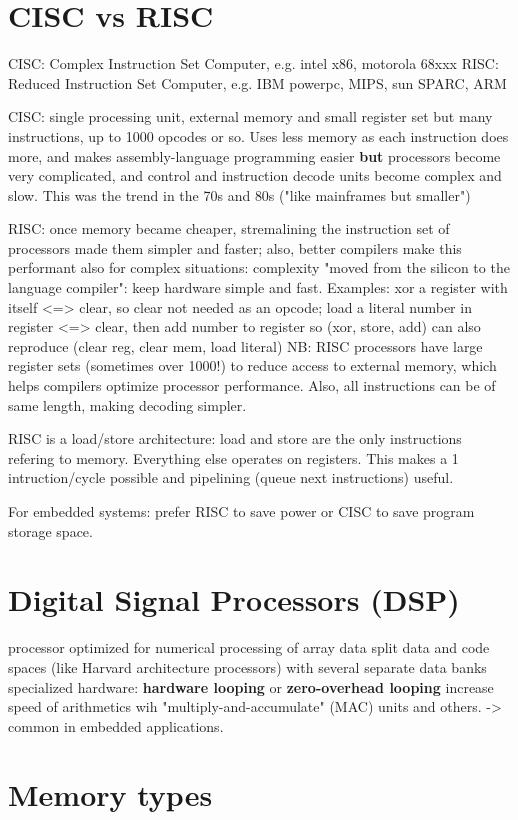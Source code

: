 \documentclass[11pt]{article}
\begin{document}
\section{CISC vs RISC}
\label{sec:org2ea98f2}
CISC: Complex Instruction Set Computer, e.g. intel x86, motorola 68xxx
RISC: Reduced Instruction Set Computer, e.g. IBM powerpc, MIPS, sun SPARC, ARM

CISC: single processing unit, external memory and small register set but many
instructions, up to 1000 opcodes or so. Uses less memory as each instruction
does more, and makes assembly-language programming easier \textbf{but} processors
become very complicated, and control and instruction decode units become complex
and slow. This was the trend in the 70s and 80s ("like mainframes but smaller")

RISC: once memory became cheaper, stremalining the instruction set of processors
made them simpler and faster; also, better compilers make this performant also
for complex situations: complexity "moved from the silicon to the language
compiler": keep hardware simple and fast.
Examples: xor a register with itself <=> clear, so clear not needed as an opcode;
      load a literal number in register <=> clear, then add number to register
 so (xor, store, add) can also reproduce (clear reg, clear mem, load literal)
NB: RISC processors have large register sets (sometimes over 1000!) to reduce
access to external memory, which helps compilers optimize processor performance.
Also, all instructions can be of same length, making decoding simpler.

RISC is a load/store architecture: load and store are the only instructions
refering to memory. Everything else operates on registers. This makes a 1
intruction/cycle possible and pipelining (queue next instructions) useful.

For embedded systems: prefer RISC to save power or CISC to save program storage space.
\section{Digital Signal Processors (DSP)}
\label{sec:orge4a7337}
processor optimized for numerical processing of array data
split data and code spaces (like Harvard architecture processors) with several
separate data banks
specialized hardware: \textbf{\textbf{hardware looping}} or \textbf{\textbf{zero-overhead looping}}
increase speed of arithmetics wih "multiply-and-accumulate" (MAC) units and others.
-> common in embedded applications.
\section{Memory types}
\label{sec:org121fd2c}
\end{document}
